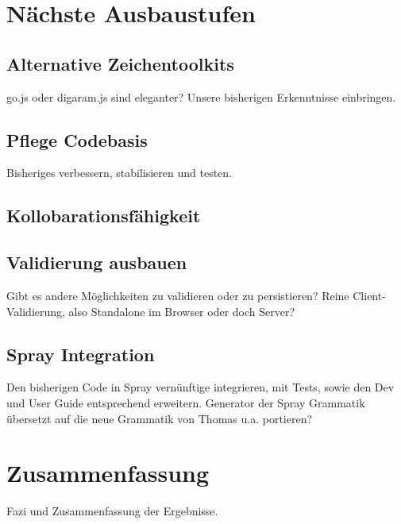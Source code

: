 \section{Nächste Ausbaustufen}

\subsection{Alternative Zeichentoolkits}

go.js oder digaram.js sind eleganter?
Unsere bisherigen Erkenntnisse einbringen.

\subsection{Pflege Codebasis}

Bisheriges verbessern, stabilisieren und testen.

\subsection{Kollobarationsfähigkeit}

\subsection{Validierung ausbauen}

Gibt es andere Möglichkeiten zu validieren oder zu persistieren?
Reine Client-Validierung, also Standalone im Browser oder doch Server?

\subsection{Spray Integration}

Den bisherigen Code in Spray vernünftige integrieren, mit Tests, sowie
den Dev und User Guide entsprechend erweitern.
Generator der Spray Grammatik übersetzt auf die neue Grammatik von Thomas u.a.
portieren?


\section{Zusammenfassung}

Fazi und Zusammenfassung der Ergebnisse.
